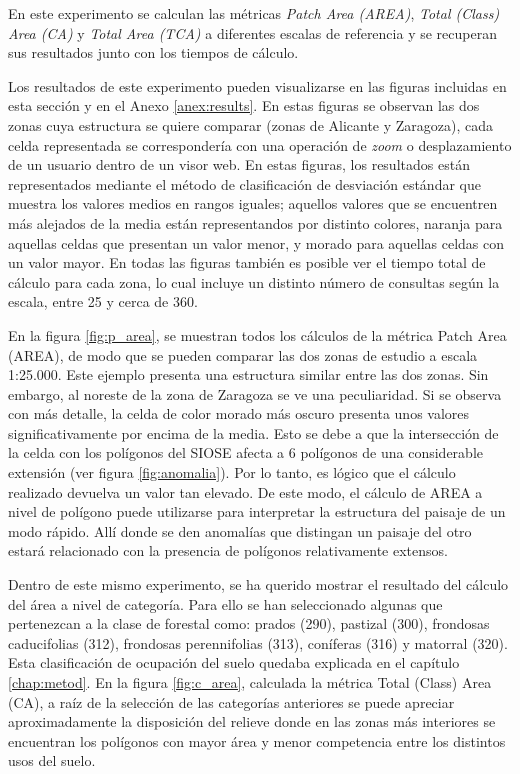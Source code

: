 En este experimento se calculan las métricas \textit{Patch Area (AREA)}, \textit{Total (Class) Area (CA)} y \textit{Total Area (TCA)} a diferentes escalas de referencia y se recuperan sus resultados junto con los tiempos de cálculo. 

Los resultados de este experimento pueden visualizarse en las figuras incluidas en esta sección y en el Anexo \ref{anex:results}. En estas figuras se observan las dos zonas cuya estructura se quiere comparar (zonas de Alicante y Zaragoza), cada celda representada se correspondería con una operación de \textit{zoom} o desplazamiento de un usuario dentro de un visor web. En estas figuras, los resultados están representados mediante el método de clasificación de desviación estándar que muestra los valores medios en rangos iguales; aquellos valores que se encuentren más alejados de la media están representandos por distinto colores, naranja para aquellas celdas que presentan un valor menor, y morado para aquellas celdas con un valor mayor. En todas las figuras también es posible ver el tiempo total de cálculo para cada zona, lo cual incluye un distinto número de consultas según la escala, entre 25 y cerca de 360.

En la figura \ref{fig:p_area}, se muestran todos los cálculos de la métrica Patch Area (AREA), de modo que se pueden comparar las dos zonas de estudio a escala 1:25.000. Este ejemplo presenta una estructura similar entre las dos zonas. Sin embargo, al noreste de la zona de Zaragoza se ve una peculiaridad. Si se observa con más detalle, la celda de color morado más oscuro presenta unos valores significativamente por encima de la media. Esto se debe a que la intersección de la celda con los polígonos del SIOSE afecta a 6 polígonos de una considerable extensión (ver figura \ref{fig:anomalia}). Por lo tanto, es lógico que el cálculo realizado devuelva un valor tan elevado. De este modo, el cálculo de AREA a nivel de polígono puede utilizarse para interpretar la estructura del paisaje de un modo rápido. Allí donde se den anomalías que distingan un paisaje del otro estará relacionado con la presencia de polígonos relativamente extensos.

Dentro de este mismo experimento, se ha querido mostrar el resultado del cálculo del área a nivel de categoría. Para ello se han seleccionado algunas que pertenezcan a la clase de forestal como: prados (290), pastizal (300), frondosas caducifolias (312), frondosas perennifolias (313), coníferas (316) y matorral (320). Esta clasificación de ocupación del suelo quedaba explicada en el capítulo \ref{chap:metod}. En la figura \ref{fig:c_area}, calculada la métrica Total (Class) Area (CA), a raíz de la selección de las categorías anteriores se puede apreciar aproximadamente la disposición del relieve donde en las zonas más interiores se encuentran los polígonos con mayor área y menor competencia entre los distintos usos del suelo.

